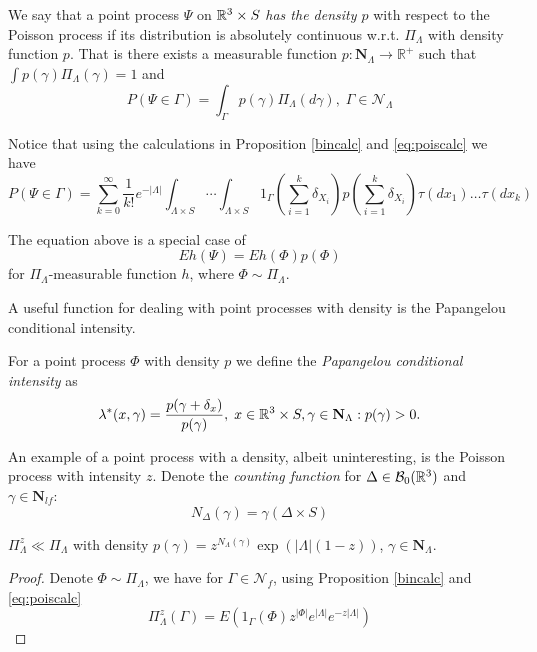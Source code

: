 \begin{definition}
We say that a point process $\Psi$ on ${\mathbb R^3} \times S$ \textit{has the density $p$} with respect to the Poisson process if its distribution is absolutely continuous w.r.t. $\Pi_\Lambda$ with density function $p$. That is there exists a measurable function $p: \mathbf N_\Lambda \to \mathbb R^+$ such that $\int p(\gamma) \Pi_\Lambda (\gamma)=1$ and
$$P(\Psi \in \Gamma) = \int_\Gamma p(\gamma) \Pi_\Lambda(d\gamma), \; \Gamma \in \mathcal N_{\Lambda}$$
\end{definition}

Notice that using the calculations in Proposition \ref{bincalc} and \eqref{eq:poiscalc} we have
$$
P(\Psi \in \Gamma) = \sum^\infty_{k=0} \frac{1}{k!} e^{-|\Lambda|} \int_{\Lambda\times S} \cdots \int_{\Lambda\times S} 1_{\Gamma} \left(\sum^k_{i=1} \delta_{X_i}\right) p\left(\sum^k_{i=1} \delta_{X_i}\right) \tau(dx_1) \dots \tau(dx_k)
$$

	The equation above is a special case of 
$$Eh(\Psi)=Eh(\Phi)p(\Phi)$$
for $\Pi_\Lambda$-measurable function $h$, where $\Phi \sim \Pi_\Lambda$.

A useful function for dealing with point processes with density is the Papangelou conditional intensity.
\begin{definition}
	For  a point process $\Phi$ with density $p$ we define the \textit{Papangelou conditional intensity} as 
	$$\lambda^*(x,\gamma) = \frac{p(\gamma + \delta_x)}{p(\gamma)}, \; x \in {\mathbb R^3} \times S, \gamma \in \mathbf N_{\Lambda}: p(\gamma)>0.$$
\end{definition}

An example of a point process with a density, albeit uninteresting, is the Poisson process with intensity $z$.\newline
Denote the \textit{counting function} for $\Delta \in \mathcal B_0({\mathbb R^3})$ and $\gamma \in \mathbf N_{lf}$:
$$N_\Delta(\gamma) = \gamma(\Delta \times S)$$ 

\begin{proposition} $\Pi_\Lambda^z \ll \Pi_\Lambda$ with density $p(\gamma)=z^{N_\Lambda(\gamma)} \exp(|\Lambda|(1-z))$, $\gamma \in \mathbf N_{\Lambda}$.
\end{proposition}
\begin{proof}
	Denote $\Phi \sim \Pi_\Lambda$, we have for $\Gamma\in \mathcal N_{f}$, using Proposition \ref{bincalc} and \eqref{eq:poiscalc}
	$$\Pi^z_\Lambda(\Gamma) = E(1_\Gamma(\Phi)  z^{|\Phi|} e^{|\Lambda|} e^{-z|\Lambda|}) $$
\end{proof}





